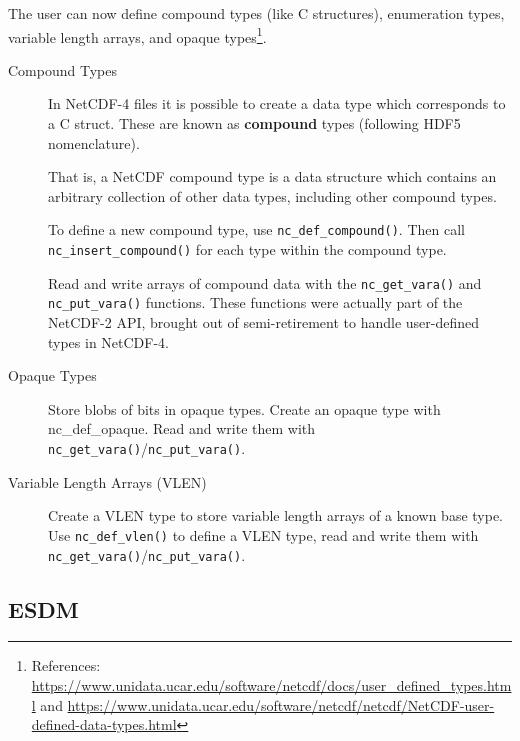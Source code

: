 The user can now define compound types (like C structures), enumeration types, variable length arrays, and opaque types\footnote{References: \url{https://www.unidata.ucar.edu/software/netcdf/docs/user\_defined\_types.html} and \url{https://www.unidata.ucar.edu/software/netcdf/netcdf/NetCDF-user-defined-data-types.html}}.

\begin{description}

\item[Compound Types]

In NetCDF-4 files it is possible to create a data type which corresponds to a C struct. These are known as \textbf{compound} types (following HDF5 nomenclature).

That is, a NetCDF compound type is a data structure which contains an arbitrary collection of other data types, including other compound types.

To define a new compound type, use \texttt{nc\_def\_compound()}. Then call \texttt{nc\_insert\_compound()} for each type within the compound type.

Read and write arrays of compound data with the \texttt{nc\_get\_vara()} and \texttt{nc\_put\_vara()} functions. These functions were actually part of the NetCDF-2 API, brought out of semi-retirement to handle user-defined types in NetCDF-4.

\item[Opaque Types]

Store blobs of bits in opaque types. Create an opaque type with nc\_def\_opaque. Read and write them with \texttt{nc\_get\_vara()}/\texttt{nc\_put\_vara()}.

\item[Variable Length Arrays (VLEN)]

Create a VLEN type to store variable length arrays of a known base type. Use \texttt{nc\_def\_vlen()} to define a VLEN type, read and write them with \texttt{nc\_get\_vara()}/\texttt{nc\_put\_vara()}.

\end{description}

\subsection{ESDM}

